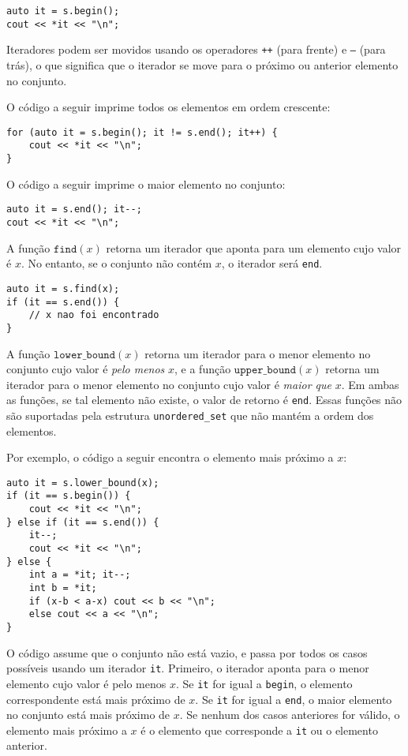 \begin{lstlisting}
auto it = s.begin();
cout << *it << "\n";
\end{lstlisting}

Iteradores podem ser movidos usando os operadores
\texttt{++} (para frente) e \texttt{--} (para trás),
o que significa que o iterador se move para o próximo
ou anterior elemento no conjunto.

O código a seguir imprime todos os elementos
em ordem crescente:
\begin{lstlisting}
for (auto it = s.begin(); it != s.end(); it++) {
    cout << *it << "\n";
}
\end{lstlisting}
O código a seguir imprime o maior elemento no conjunto:
\begin{lstlisting}
auto it = s.end(); it--;
cout << *it << "\n";
\end{lstlisting}

A função $\texttt{find}(x)$ retorna um iterador
que aponta para um elemento cujo valor é $x$.
No entanto, se o conjunto não contém $x$,
o iterador será \texttt{end}.

\begin{lstlisting}
auto it = s.find(x);
if (it == s.end()) {
    // x nao foi encontrado
}
\end{lstlisting}

A função $\texttt{lower\_bound}(x)$ retorna
um iterador para o menor elemento no conjunto
cujo valor é \emph{pelo menos} $x$, e
a função $\texttt{upper\_bound}(x)$
retorna um iterador para o menor elemento no conjunto
cujo valor é \emph{maior que} $x$.
Em ambas as funções, se tal elemento não existe,
o valor de retorno é \texttt{end}.
Essas funções não são suportadas pela
estrutura \texttt{unordered\_set} que
não mantém a ordem dos elementos.

\begin{samepage}
Por exemplo, o código a seguir encontra o elemento
mais próximo a $x$:

\begin{lstlisting}
auto it = s.lower_bound(x);
if (it == s.begin()) {
    cout << *it << "\n";
} else if (it == s.end()) {
    it--;
    cout << *it << "\n";
} else {
    int a = *it; it--;
    int b = *it;
    if (x-b < a-x) cout << b << "\n";
    else cout << a << "\n";
}
\end{lstlisting}

O código assume que o conjunto não está vazio,
e passa por todos os casos possíveis
usando um iterador \texttt{it}.
Primeiro, o iterador aponta para o menor
elemento cujo valor é pelo menos $x$.
Se \texttt{it} for igual a \texttt{begin},
o elemento correspondente está mais próximo de $x$.
Se \texttt{it} for igual a \texttt{end},
o maior elemento no conjunto está mais próximo de $x$.
Se nenhum dos casos anteriores for válido,
o elemento mais próximo a $x$ é o
elemento que corresponde a \texttt{it} ou o elemento anterior.
\end{samepage}

